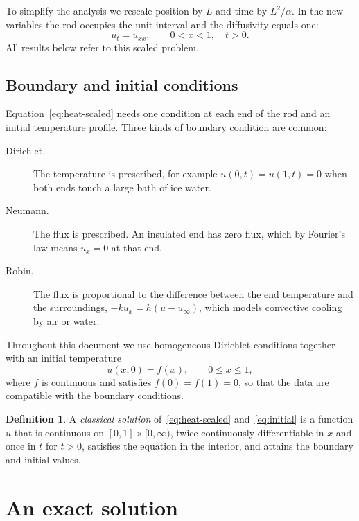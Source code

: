 \documentclass[11pt]{article}
\theoremstyle{definition}
\newtheorem{definition}[theorem]{Definition}
\theoremstyle{remark}
\begin{document}
To simplify the analysis we rescale position by $L$ and time by $L^2 / \alpha$. In the new variables the rod occupies the unit interval and the diffusivity equals one:
\begin{equation}\label{eq:heat-scaled}
  u_t = u_{xx}, \qquad 0 < x < 1, \quad t > 0.
\end{equation}
All results below refer to this scaled problem.

\subsection{Boundary and initial conditions}

Equation~\eqref{eq:heat-scaled} needs one condition at each end of the rod and an initial temperature profile. Three kinds of boundary condition are common:
\begin{description}
  \item[Dirichlet.] The temperature is prescribed, for example $u(0,t) = u(1,t) = 0$ when both ends touch a large bath of ice water.
  \item[Neumann.] The flux is prescribed. An insulated end has zero flux, which by Fourier's law means $u_x = 0$ at that end.
  \item[Robin.] The flux is proportional to the difference between the end temperature and the surroundings, $-k u_x = h(u - u_\infty)$, which models convective cooling by air or water.
\end{description}
Throughout this document we use homogeneous Dirichlet conditions together with an initial temperature
\begin{equation}\label{eq:initial}
  u(x, 0) = f(x), \qquad 0 \le x \le 1,
\end{equation}
where $f$ is continuous and satisfies $f(0) = f(1) = 0$, so that the data are compatible with the boundary conditions.

\begin{definition}
A \emph{classical solution} of~\eqref{eq:heat-scaled} and~\eqref{eq:initial} is a function $u$ that is continuous on $[0,1] \times [0,\infty)$, twice continuously differentiable in $x$ and once in $t$ for $t > 0$, satisfies the equation in the interior, and attains the boundary and initial values.
\end{definition}

\section{An exact solution}\label{sec:exact}
\end{document}
